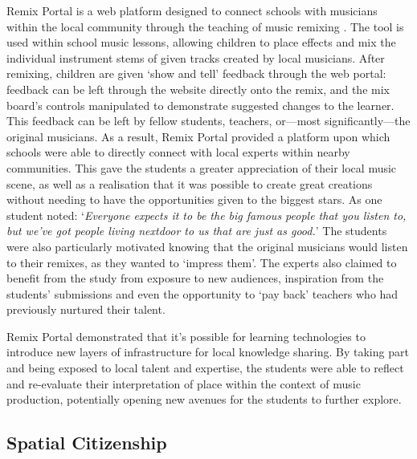 Remix Portal is a web platform designed to connect schools with musicians within the local community through the teaching of music remixing \citep{Dodds2017}. The tool is used within school music lessons, allowing children to place effects and mix the individual instrument stems of given tracks created by local musicians. After remixing, children are given `show and tell' feedback through the web portal: feedback can be left through the website directly onto the remix, and the mix board's controls manipulated to demonstrate suggested changes to the learner. This feedback can be left by fellow students, teachers, or---most significantly---the original musicians. As a result, Remix Portal provided a platform upon which schools were able to directly connect with local experts within nearby communities. This gave the students a greater appreciation of their local music scene, as well as a realisation that it was possible to create great creations without needing to have the opportunities given to the biggest stars. As one student noted: `\textit{Everyone expects it to be the big famous people that you listen to, but we've got people living nextdoor to us that are just as good.}' The students were also particularly motivated knowing that the original musicians would listen to their remixes, as they wanted to `impress them'. The experts also claimed to benefit from the study from exposure to new audiences, inspiration from the students' submissions and even the opportunity to `pay back' teachers who had previously nurtured their talent.

Remix Portal demonstrated that it's possible for learning technologies to introduce new layers of infrastructure for local knowledge sharing. By taking part and being exposed to local talent and expertise, the students were able to reflect and re-evaluate their interpretation of place within the context of music production, potentially opening new avenues for the students to further explore.

\subsection{Spatial Citizenship}

